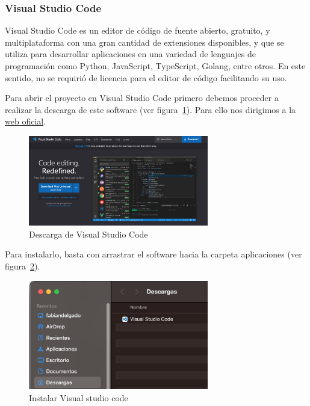 \subsubsection{Visual Studio Code}\label{visual-studio-code}

Visual Studio Code es un editor de código de fuente abierto, gratuito, y multiplataforma con una gran cantidad de extensiones disponibles, y que se utiliza para desarrollar aplicaciones en una variedad de lenguajes de programación como Python, JavaScript, TypeScript, Golang, entre otros. En este sentido, no se requirió de licencia para el editor de código facilitando su uso.

Para abrir el proyecto en Visual Studio Code primero debemos proceder a realizar la descarga de este software (ver figura~\ref{Img:Descarga+de+Visual+studio+code}).
Para ello nos dirigimos a la \href{https://code.visualstudio.com/}{web oficial}. 

\begin{figure}[h]
    \centering
    \includegraphics[width=0.7\textwidth]{img/manual/visual-studio-code.png}
    \caption{Descarga de Visual Studio Code} \label{Img:Descarga+de+Visual+studio+code}
\end{figure} 

Para instalarlo, basta con arrastrar el software hacia la carpeta aplicaciones (ver figura~\ref{Img:Instalar+Visual+studio+code}).
\begin{figure}[h]
    \centering
    \includegraphics[width=0.7\textwidth]{img/manual/instalar-visual-studio-code.png}
    \caption{Instalar Visual studio code} \label{Img:Instalar+Visual+studio+code}
\end{figure} 

